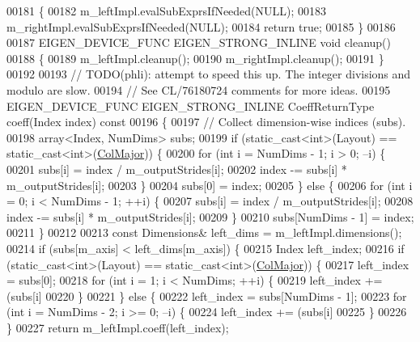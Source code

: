 \begin{DoxyCode}
00181   \{
00182     m\_leftImpl.evalSubExprsIfNeeded(NULL);
00183     m\_rightImpl.evalSubExprsIfNeeded(NULL);
00184     \textcolor{keywordflow}{return} \textcolor{keyword}{true};
00185   \}
00186 
00187   EIGEN\_DEVICE\_FUNC EIGEN\_STRONG\_INLINE \textcolor{keywordtype}{void} cleanup()
00188   \{
00189     m\_leftImpl.cleanup();
00190     m\_rightImpl.cleanup();
00191   \}
00192 
00193   \textcolor{comment}{// TODO(phli): attempt to speed this up. The integer divisions and modulo are slow.}
00194   \textcolor{comment}{// See CL/76180724 comments for more ideas.}
00195   EIGEN\_DEVICE\_FUNC EIGEN\_STRONG\_INLINE CoeffReturnType coeff(Index index)\textcolor{keyword}{ const}
00196 \textcolor{keyword}{  }\{
00197     \textcolor{comment}{// Collect dimension-wise indices (subs).}
00198     array<Index, NumDims> subs;
00199     \textcolor{keywordflow}{if} (static\_cast<int>(Layout) == static\_cast<int>(\hyperlink{group__enums_ggaacded1a18ae58b0f554751f6cdf9eb13a0cbd4bdd0abcfc0224c5fcb5e4f6669a}{ColMajor})) \{
00200       \textcolor{keywordflow}{for} (\textcolor{keywordtype}{int} i = NumDims - 1; i > 0; --i) \{
00201         subs[i] = index / m\_outputStrides[i];
00202         index -= subs[i] * m\_outputStrides[i];
00203       \}
00204       subs[0] = index;
00205     \} \textcolor{keywordflow}{else} \{
00206       \textcolor{keywordflow}{for} (\textcolor{keywordtype}{int} i = 0; i < NumDims - 1; ++i) \{
00207         subs[i] = index / m\_outputStrides[i];
00208         index -= subs[i] * m\_outputStrides[i];
00209       \}
00210       subs[NumDims - 1] = index;
00211     \}
00212 
00213     \textcolor{keyword}{const} Dimensions& left\_dims = m\_leftImpl.dimensions();
00214     \textcolor{keywordflow}{if} (subs[m\_axis] < left\_dims[m\_axis]) \{
00215       Index left\_index;
00216       \textcolor{keywordflow}{if} (static\_cast<int>(Layout) == static\_cast<int>(\hyperlink{group__enums_ggaacded1a18ae58b0f554751f6cdf9eb13a0cbd4bdd0abcfc0224c5fcb5e4f6669a}{ColMajor})) \{
00217         left\_index = subs[0];
00218         \textcolor{keywordflow}{for} (\textcolor{keywordtype}{int} i = 1; i < NumDims; ++i) \{
00219           left\_index += (subs[i] %
00220         \}
00221       \} \textcolor{keywordflow}{else} \{
00222         left\_index = subs[NumDims - 1];
00223         \textcolor{keywordflow}{for} (\textcolor{keywordtype}{int} i = NumDims - 2; i >= 0; --i) \{
00224           left\_index += (subs[i] %
00225         \}
00226       \}
00227       \textcolor{keywordflow}{return} m\_leftImpl.coeff(left\_index);

\end{DoxyCode}
